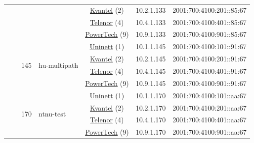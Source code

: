 \begin{small}
\begin{center}
\begin{longtable}{|c|c|c|c|c|c|c|c|}
  &  &  &  & \multicolumn{2}{|c|}{\tiny{\href{http://kvantel.no}{Kvantel} (2)}} & \tiny{10.2.1.133} & \tiny{2001:700:4100:201::85:67} \\* \cline{5-5}\cline{6-6}\cline{7-7}\cline{8-8}
  &  &  &  & \multicolumn{2}{|c|}{\tiny{\href{https://www.telenor.no}{Telenor} (4)}} & \tiny{10.4.1.133} & \tiny{2001:700:4100:401::85:67} \\* \cline{5-5}\cline{6-6}\cline{7-7}\cline{8-8}
  &  &  &  & \multicolumn{2}{|c|}{\tiny{\href{http://www.powertech.no}{PowerTech} (9)}} & \tiny{10.9.1.133} & \tiny{2001:700:4100:901::85:67} \\* \cline{3-3}\cline{4-4}\cline{5-5}\cline{6-6}\cline{7-7}\cline{8-8}
  &  & \multirow{4}{*}{\tiny{145}} & \multicolumn{1}{|l|}{\multirow{4}{*}{\tiny{hu-multipath}}} & \multicolumn{2}{|c|}{\tiny{\href{https://www.uninett.no}{Uninett} (1)}} & \tiny{10.1.1.145} & \tiny{2001:700:4100:101::91:67} \\* \cline{5-5}\cline{6-6}\cline{7-7}\cline{8-8}
  &  &  &  & \multicolumn{2}{|c|}{\tiny{\href{http://kvantel.no}{Kvantel} (2)}} & \tiny{10.2.1.145} & \tiny{2001:700:4100:201::91:67} \\* \cline{5-5}\cline{6-6}\cline{7-7}\cline{8-8}
  &  &  &  & \multicolumn{2}{|c|}{\tiny{\href{https://www.telenor.no}{Telenor} (4)}} & \tiny{10.4.1.145} & \tiny{2001:700:4100:401::91:67} \\* \cline{5-5}\cline{6-6}\cline{7-7}\cline{8-8}
  &  &  &  & \multicolumn{2}{|c|}{\tiny{\href{http://www.powertech.no}{PowerTech} (9)}} & \tiny{10.9.1.145} & \tiny{2001:700:4100:901::91:67} \\* \cline{3-3}\cline{4-4}\cline{5-5}\cline{6-6}\cline{7-7}\cline{8-8}
  &  & \multirow{4}{*}{\tiny{170}} & \multicolumn{1}{|l|}{\multirow{4}{*}{\tiny{ntnu-test}}} & \multicolumn{2}{|c|}{\tiny{\href{https://www.uninett.no}{Uninett} (1)}} & \tiny{10.1.1.170} & \tiny{2001:700:4100:101::aa:67} \\* \cline{5-5}\cline{6-6}\cline{7-7}\cline{8-8}
  &  &  &  & \multicolumn{2}{|c|}{\tiny{\href{http://kvantel.no}{Kvantel} (2)}} & \tiny{10.2.1.170} & \tiny{2001:700:4100:201::aa:67} \\* \cline{5-5}\cline{6-6}\cline{7-7}\cline{8-8}
  &  &  &  & \multicolumn{2}{|c|}{\tiny{\href{https://www.telenor.no}{Telenor} (4)}} & \tiny{10.4.1.170} & \tiny{2001:700:4100:401::aa:67} \\* \cline{5-5}\cline{6-6}\cline{7-7}\cline{8-8}
  &  &  &  & \multicolumn{2}{|c|}{\tiny{\href{http://www.powertech.no}{PowerTech} (9)}} & \tiny{10.9.1.170} & \tiny{2001:700:4100:901::aa:67} \\* \cline{3-3}\cline{4-4}\cline{5-5}\cline{6-6}\cline{7-7}\cline{8-8}

\end{longtable}
\end{center}
\end{small}
